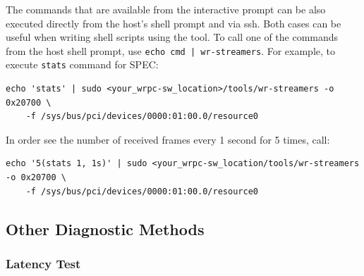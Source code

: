 \documentclass[a4paper, 12pt]{article}
\renewcommand{\_}{\underscore\allowbreak}
\begin{document}
The commands that are available from the interactive prompt can be also executed directly
from the host's shell prompt and via ssh. Both cases can be useful when writing shell 
scripts using the tool. To call one of the commands from the host shell prompt, use
\texttt{echo cmd | wr-streamers}. For example, to execute \texttt{stats} command for SPEC:
\begin{lstlisting}
echo 'stats' | sudo <your_wrpc-sw_location>/tools/wr-streamers -o 0x20700 \
    -f /sys/bus/pci/devices/0000:01:00.0/resource0
\end{lstlisting}
In order see the number of received frames every 1 second for 5 times, call:
\begin{lstlisting}
echo '5(stats 1, 1s)' | sudo <your_wrpc-sw_location/tools/wr-streamers -o 0x20700 \
    -f /sys/bus/pci/devices/0000:01:00.0/resource0
\end{lstlisting}

\newpage
\subsection{Other Diagnostic Methods}
\label{Other Diagnostic Tools}

\subsubsection{Latency Test}
\label{Latency Test}
\end{document}
